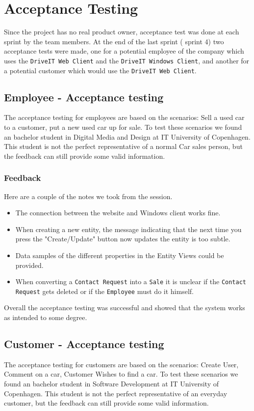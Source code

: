 \section{Acceptance Testing}
Since the project has no real product owner, acceptance test was done at each sprint by the team members. At the end of the last sprint ( sprint 4) two acceptance tests were made, one for a potential employee of the company which uses the \texttt{DriveIT Web Client} and the \texttt{DriveIT Windows Client}, and another for a potential customer which would use the \texttt{DriveIT Web Client}.
\subsection{Employee - Acceptance testing}
The acceptance testing for employees are based on the scenarios:  Sell a used car to a customer, put a new used car up for sale. To test these scenarios we found an bachelor student in Digital Media and Design at IT University of Copenhagen. This student is not the perfect representative of a normal Car sales person, but the feedback can still provide some valid information.
\subsubsection{Feedback}
Here are a couple of the notes we took from the session.
\begin{itemize}
	\item The connection between the website and Windows client works fine.
	\item When creating a new entity, the message indicating that the next time you press the "Create/Update" button now updates the entity is too subtle.
	\item Data samples of the different properties in the Entity Views could be provided.
	\item When converting a \texttt{Contact Request} into a \texttt{Sale} it is unclear if the \texttt{Contact Request} gets deleted or if the \texttt{Employee} must do it himself.
\end{itemize}
Overall the acceptance testing was successful and showed that the system works as intended to some degree.
\subsection{Customer - Acceptance testing}
The acceptance testing for customers are based on the scenarios:  Create User, Comment on a car, Customer Wishes to find a car. To test these scenarios we found an bachelor student in Software Development at IT University of Copenhagen. This student is not the perfect representative of an everyday customer, but the feedback can still provide some valid information.
